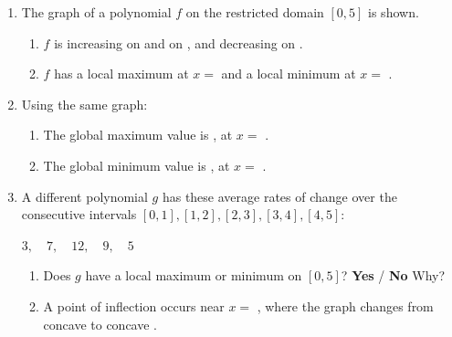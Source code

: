 \documentclass[10pt]{article}
\begin{document}

\vspace{0.12in}

\begin{enumerate}[itemsep=10pt]

\item The graph of a polynomial $f$ on the restricted domain $[0, 5]$ is
      shown.

\begin{center}
\end{center}

\begin{enumerate}[label=(\alph*), itemsep=4pt]
  \item $f$ is increasing on \blank{1.6cm} and on \blank{1.6cm} , and
        decreasing on \blank{1.6cm} .
  \item $f$ has a local maximum at $x = $ \blank{1.2cm} and a local
        minimum at $x = $ \blank{1.2cm} .
\end{enumerate}

\item Using the same graph:

\begin{enumerate}[label=(\alph*), itemsep=4pt]
  \item The global maximum value is \blank{1.2cm} , at $x = $
        \blank{1.2cm} .
  \item The global minimum value is \blank{1.2cm} , at $x = $
        \blank{1.2cm} .
\end{enumerate}

\item A different polynomial $g$ has these average rates of change over the
      consecutive intervals $[0,1], [1,2], [2,3], [3,4], [4,5]$:

      \begin{center}
      $3,\quad 7,\quad 12,\quad 9,\quad 5$
      \end{center}

\begin{enumerate}[label=(\alph*), itemsep=4pt]
  \item Does $g$ have a local maximum or minimum on $[0, 5]$? \quad
        \textbf{Yes} / \textbf{No} \quad Why? \blank{4.6cm}
  \item A point of inflection occurs near $x = $ \blank{1.2cm} , where the
        graph changes from concave \blank{1.4cm} to concave \blank{1.4cm} .
\end{enumerate}

\end{enumerate}
\end{document}
